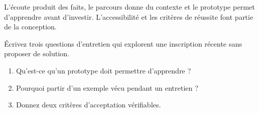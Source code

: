 \documentclass[12pt,twoside]{upbcours}
\begin{document}
\begin{resumechapitre}
  L'écoute produit des faits, le parcours donne du contexte et le prototype permet d'apprendre
  avant d'investir. L'accessibilité et les critères de réussite font partie de la conception.
\end{resumechapitre}
\begin{evalformative}
  Écrivez trois questions d'entretien qui explorent une inscription récente sans proposer de solution.
\end{evalformative}
\begin{autoevaluation}
  \begin{enumerate}
    \item Qu'est-ce qu'un prototype doit permettre d'apprendre ?
    \item Pourquoi partir d'un exemple vécu pendant un entretien ?
    \item Donnez deux critères d'acceptation vérifiables.
  \end{enumerate}
\end{autoevaluation}
\end{document}
